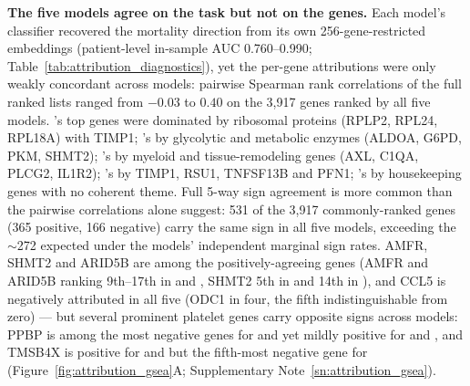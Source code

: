 \textbf{The five models agree on the task but not on the genes.} Each
model's classifier recovered the mortality direction from its own
256-gene-restricted embeddings (patient-level in-sample AUC 0.760--0.990;
Table~\ref{tab:attribution_diagnostics}), yet the per-gene attributions were
only weakly concordant across models: pairwise Spearman rank correlations of
the full ranked lists ranged from $-0.03$ to $0.40$ on the 3{,}917 genes
ranked by all five models. 's top genes were dominated by
ribosomal proteins (RPLP2, RPL24, RPL18A) with TIMP1; 's by
glycolytic and metabolic enzymes (ALDOA, G6PD, PKM, SHMT2); 's by
myeloid and tissue-remodeling genes (AXL, C1QA, PLCG2, IL1R2);
's by TIMP1, RSU1, TNFSF13B and PFN1; 's by
housekeeping genes with no coherent theme. Full 5-way sign agreement is more
common than the pairwise correlations alone suggest: 531 of the 3{,}917
commonly-ranked genes (365 positive, 166 negative) carry the same sign in
all five models, exceeding the $\sim$272 expected under the models'
independent marginal sign rates. AMFR, SHMT2 and ARID5B are among the
positively-agreeing genes (AMFR and ARID5B ranking 9th--17th in
 and , SHMT2 5th in  and 14th in
), and CCL5 is negatively attributed in all five (ODC1 in
four, the fifth indistinguishable from zero) --- but several prominent
platelet genes carry opposite signs across models: PPBP is among the most
negative genes for  and  yet mildly positive
for  and , and TMSB4X is positive for
 and  but the fifth-most negative gene for
 (Figure~\ref{fig:attribution_gsea}A;
Supplementary Note~\ref{sn:attribution_gsea}).

